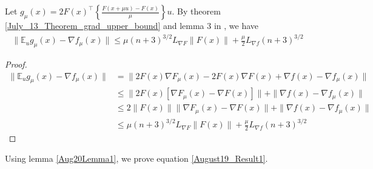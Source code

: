 \documentclass{article}
\begin{document}
\begin{lemma} \label{Aug20Lemma1}
Let $g_{\mu}(x) = 2F(x)^\top\left\{\frac{F(x+\mu u)-F(x)}{\mu}\right\}u$. By theorem \ref{July_13_Theorem_grad_upper_bound} and lemma $3$ in \cite{Nesterov2015}, we have 
\begin{align}
\| \mathbb{E}_ug_{\mu}(x) - \nabla f_{\mu}(x)\| \leq \mu(n+3)^{3/2}L_{\nabla F}\|F(x)\| + \frac{\mu}{2}L_{\nabla f}(n+3)^{3/2}
\end{align}

\begin{proof}
\begin{align*}
\| \mathbb{E}_ug_{\mu}(x) - \nabla f_{\mu}(x)\| & = \| 2F(x)\nabla F_{\mu}(x) - 2F(x)\nabla F(x) + \nabla f(x) - \nabla f_{\mu}(x) \| \\ & \leq \|2F(x)[\nabla F_{\mu}(x) - \nabla F(x)]\| + \| \nabla f(x) - \nabla f_{\mu}(x)\| \\ & \leq 2\|F(x)\| \|\nabla F_{\mu}(x) - \nabla F(x)\| + \|\nabla f(x) - \nabla f_{\mu}(x)\| \\ & \leq \mu(n+3)^{3/2}L_{\nabla F}\|F(x)\| + \frac{\mu}{2}L_{\nabla f}(n+3)^{3/2}
\end{align*}
\end{proof}
\end{lemma}

Using lemma \ref{Aug20Lemma1}, we prove equation \eqref{August19_Result1}. 
\end{document}
